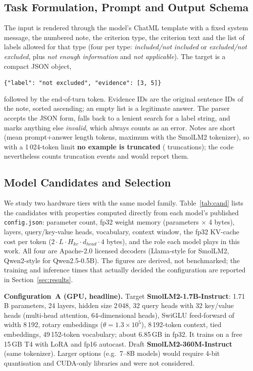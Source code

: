 \subsection{Task Formulation, Prompt and Output Schema}
The input is rendered through the model's ChatML template with a fixed system message, the numbered note, the criterion type, the criterion text and the list of labels allowed for that type (four per type: \emph{included/not included} or \emph{excluded/not excluded}, plus \emph{not enough information} and \emph{not applicable}). The target is a compact JSON object,
\begin{center}\small\texttt{\{"label": "not excluded", "evidence": [3, 5]\}}\end{center}
followed by the end-of-turn token. Evidence IDs are the original sentence IDs of the note, sorted ascending; an empty list is a legitimate answer. The parser accepts the JSON form, falls back to a lenient search for a label string, and marks anything else \emph{invalid}, which always counts as an error. Notes are short (mean prompt+answer length \TMeanTok{} tokens, maximum \TMaxTok{} with the SmolLM2 tokenizer), so with a 1\,024-token limit \textbf{no example is truncated} (\TTrunc{} truncations); the code nevertheless counts truncation events and would report them.

\subsection{Model Candidates and Selection}
We study two hardware tiers with the same model family. Table~\ref{tab:cand} lists the candidates with properties computed directly from each model's published \texttt{config.json}: parameter count, fp32 weight memory (parameters $\times$ 4 bytes), layers, query/key-value heads, vocabulary, context window, the fp32 KV-cache cost per token ($2\cdot L\cdot H_{kv}\cdot d_{head}\cdot 4$ bytes), and the role each model plays in this work. All four are Apache-2.0 licensed decoders (Llama-style for SmolLM2, Qwen2-style for Qwen2.5-0.5B). The figures are derived, not benchmarked; the training and inference times that actually decided the configuration are reported in Section~\ref{sec:results}.

\textbf{Configuration~A (GPU, headline).} Target \textbf{SmolLM2-1.7B-Instruct}: 1.71\,B parameters, 24 layers, hidden size 2\,048, 32 query heads with 32 key/value heads (multi-head attention, 64-dimensional heads), SwiGLU feed-forward of width 8\,192, rotary embeddings ($\theta=1.3\times10^5$), 8\,192-token context, tied embeddings, 49\,152-token vocabulary; about 6.85\,GB in fp32. It trains on a free 15\,GB T4 with LoRA and fp16 autocast. Draft \textbf{SmolLM2-360M-Instruct} (same tokenizer). Larger options (e.g.\ 7--8B models) would require 4-bit quantisation and CUDA-only libraries and were not considered.

